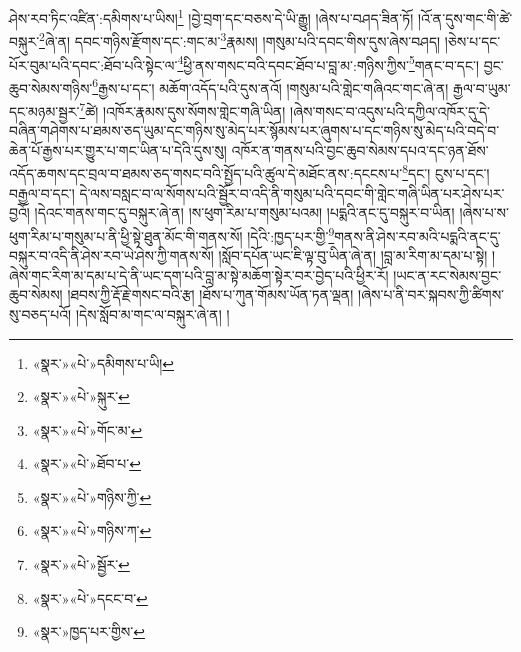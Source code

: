 ཤེས་རབ་ཏིང་འཛིན་:དམིགས་པ་ཡིས།\footnote{«སྣར་»«པེ་»དམིགས་པ་ཡི།} །བྱེ་བྲག་དང་བཅས་དེ་ཡི་རྒྱུ། །ཞེས་པ་བཤད་ཟིན་ཏོ། །འོ་ན་དུས་གང་གི་ཚེ་བསྐུར་\footnote{«སྣར་»«པེ་»སྐུར་}ཞེ་ན། དབང་གཉིས་རྫོགས་དང་:གང་མ་\footnote{«སྣར་»«པེ་»གོང་མ་}རྣམས། །གསུམ་པའི་དབང་གིས་དུས་ཞེས་བཤད། །ཅེས་པ་དང་པོར་བུམ་པའི་དབང་:ཐོབ་པའི་སྟེང་ལ་\footnote{«སྣར་»«པེ་»ཐོབ་པ་}ཕྱི་ནས་གསང་བའི་དབང་ཐོབ་པ་བླ་མ་:གཉིས་ཀྱིས་\footnote{«སྣར་»«པེ་»གཉིས་ཀྱི་}གནང་བ་དང་། བྱང་ཆུབ་སེམས་གཉིས་\footnote{«སྣར་»«པེ་»གཉིས་ཀ་}རྒྱས་པ་དང་། མཆོག་འདོད་པའི་དུས་ནའོ། །གསུམ་པའི་གླེང་གཞིའང་གང་ཞེ་ན། རྒྱལ་བ་ཡུམ་དང་མཉམ་སྦྱར་\footnote{«སྣར་»«པེ་»སྦྱོར་}ཚེ། །འཁོར་རྣམས་དུས་སོགས་གླེང་གཞི་ཡིན། །ཞེས་གསང་བ་འདུས་པའི་དཀྱིལ་འཁོར་དུ་དེ་བཞིན་གཤེགས་པ་ཐམས་ཅད་ཡུམ་དང་གཉིས་སུ་མེད་པར་སྙོམས་པར་ཞུགས་པ་དང་གཉིས་སུ་མེད་པའི་བདེ་བ་ཆེན་པོ་རྒྱས་པར་གྱུར་པ་གང་ཡིན་པ་དེའི་དུས་སུ། འཁོར་ན་གནས་པའི་བྱང་ཆུབ་སེམས་དཔའ་དང་ཉན་ཐོས་འདོད་ཆགས་དང་བྲལ་བ་ཐམས་ཅད་གསང་བའི་སྤྱོད་པའི་ཚུལ་དེ་མཐོང་ནས་:དངངས་པ་\footnote{«སྣར་»«པེ་»དངང་བ་}དང་། ངུས་པ་དང་། བརྒྱལ་བ་དང་། དེ་ལས་བསླང་བ་ལ་སོགས་པའི་སྦྱོར་བ་འདི་ནི་གསུམ་པའི་དབང་གི་གླེང་གཞི་ཡིན་པར་ཤེས་པར་བྱའོ། །དེའང་གནས་གང་དུ་བསྐུར་ཞེ་ན། །ས་ཕུག་རིམ་པ་གསུམ་པའམ། །པདྨའི་ནང་དུ་བསྐུར་བ་ཡིན། །ཞེས་པ་ས་ཕུག་རིམ་པ་གསུམ་པ་ནི་ཕྱི་སྟེ་ཐུན་མོང་གི་གནས་སོ། །དེའི་:ཁྱད་པར་གྱི་\footnote{«སྣར་»ཁྱད་པར་གྱིས་}གནས་ནི་ཤེས་རབ་མའི་པདྨའི་ནང་དུ་བསྐུར་བ་འདི་ནི་ཤེས་རབ་ཡེ་ཤེས་ཀྱི་གནས་སོ། །སློབ་དཔོན་ཡང་ཇི་ལྟ་བུ་ཡིན་ཞེ་ན། །བླ་མ་རིག་མ་དམ་པ་སྟེ། །ཞེས་གང་རིག་མ་དམ་པ་དེ་ནི་ཡང་དག་པའི་བླ་མ་སྟེ་མཆོག་སྟེར་བར་བྱེད་པའི་ཕྱིར་རོ། །ཡང་ན་རང་སེམས་བྱང་ཆུབ་སེམས། །ཐབས་ཀྱི་རྡོ་རྗེ་གསང་བའི་རྩ། །ཐོས་པ་ཀུན་གོམས་ཡོན་ཏན་ལྡན། །ཞེས་པ་ནི་བར་སྐབས་ཀྱི་ཚིགས་སུ་བཅད་པའོ། །དེས་སློབ་མ་གང་ལ་བསྐུར་ཞེ་ན། །
